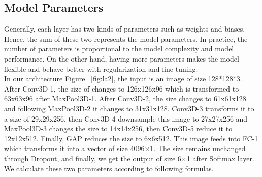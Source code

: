 \subsection{Model Parameters}
Generally, each layer has two kinds of parameters such as weights and biases. Hence, the sum of these two represents the model parameters. In practice, the number of parameters is proportional to the model complexity and model performance. On the other hand, having more parameters makes the model flexible and behave better with regularization and fine tuning.\\

In our architecture Figure ~\ref{fig:la2}, the input is an image of size 128*128*3. After Conv3D-1, the size of changes to 126x126x96 which is transformed to 63x63x96 after MaxPool3D-1. After Conv3D-2, the size changes to 61x61x128 and following MaxPool3D-2 it changes to 31x31x128. Conv3D-3 transforms it to a size of 29x29x256, then Conv3D-4 downsample this image to 27x27x256 and MaxPool3D-3 changes the size to 14x14x256, then Conv3D-5 reduce it to 12x12x512. Finally, GAP reduces the size to 6x6x512. This image feeds into FC-1 which transforms it into a vector of size 4096×1. The size remains unchanged through Dropout, and finally, we get the output of size 6×1 after Softmax layer. We calculate these two parameters according to following formulas.\\
